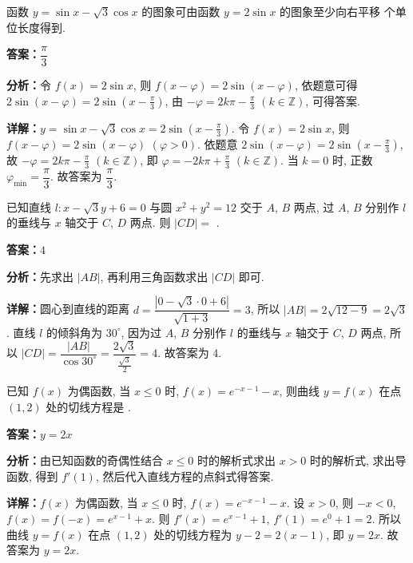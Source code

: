 \begin{question}[points=5]
函数 $y=\sin x-\sqrt{3}\cos x$ 的图象可由函数 $y=2\sin x$ 的图象至少向右平移  个单位长度得到.
\fillin[{$\dfrac{\pi}{3}$}]
\begin{solution}
\textbf{答案：}$\dfrac{\pi}{3}$

\textbf{分析：}令 $f(x)=2\sin x$, 则 $f(x-\varphi)=2\sin(x-\varphi)$, 依题意可得 $2\sin(x-\varphi)=2\sin(x-\frac{\pi}{3})$, 由 $-\varphi=2k\pi-\frac{\pi}{3}$ $(k\in\mathbb{Z})$, 可得答案.

\textbf{详解：}$y=\sin x-\sqrt{3}\cos x=2\sin(x-\frac{\pi}{3})$. 令 $f(x)=2\sin x$, 则 $f(x-\varphi)=2\sin(x-\varphi)$ $(\varphi>0)$. 依题意 $2\sin(x-\varphi)=2\sin(x-\frac{\pi}{3})$, 故 $-\varphi=2k\pi-\frac{\pi}{3}$ $(k\in\mathbb{Z})$, 即 $\varphi=-2k\pi+\frac{\pi}{3}$ $(k\in\mathbb{Z})$. 当 $k=0$ 时, 正数 $\varphi_{\min}=\dfrac{\pi}{3}$. 故答案为 $\dfrac{\pi}{3}$.
\end{solution}
\end{question}

\begin{question}[points=5]
已知直线 $l:x-\sqrt{3}y+6=0$ 与圆 $x^2+y^2=12$ 交于 $A$, $B$ 两点, 过 $A$, $B$ 分别作 $l$ 的垂线与 $x$ 轴交于 $C$, $D$ 两点. 则 $|CD|=$ .
\fillin[{$4$}]
\begin{solution}
\textbf{答案：}$4$

\textbf{分析：}先求出 $|AB|$, 再利用三角函数求出 $|CD|$ 即可.

\textbf{详解：}圆心到直线的距离 $d=\dfrac{|0-\sqrt{3}\cdot0+6|}{\sqrt{1+3}}=3$, 所以 $|AB|=2\sqrt{12-9}=2\sqrt{3}$. 直线 $l$ 的倾斜角为 $30^{\circ}$, 因为过 $A$, $B$ 分别作 $l$ 的垂线与 $x$ 轴交于 $C$, $D$ 两点, 所以 $|CD|=\dfrac{|AB|}{\cos30^{\circ}}=\dfrac{2\sqrt{3}}{\frac{\sqrt{3}}{2}}=4$. 故答案为 $4$.
\end{solution}
\end{question}

\begin{question}[points=5]
已知 $f(x)$ 为偶函数, 当 $x\le 0$ 时, $f(x)=e^{-x-1}-x$, 则曲线 $y=f(x)$ 在点 $(1,2)$ 处的切线方程是 .
\fillin[{$y=2x$}]
\begin{solution}
\textbf{答案：}$y=2x$

\textbf{分析：}由已知函数的奇偶性结合 $x\le 0$ 时的解析式求出 $x>0$ 时的解析式, 求出导函数, 得到 $f'(1)$, 然后代入直线方程的点斜式得答案.

\textbf{详解：}$f(x)$ 为偶函数, 当 $x\le 0$ 时, $f(x)=e^{-x-1}-x$. 设 $x>0$, 则 $-x<0$, $f(x)=f(-x)=e^{x-1}+x$. 则 $f'(x)=e^{x-1}+1$, $f'(1)=e^0+1=2$. 所以曲线 $y=f(x)$ 在点 $(1,2)$ 处的切线方程为 $y-2=2(x-1)$, 即 $y=2x$. 故答案为 $y=2x$.
\end{solution}
\end{question}


